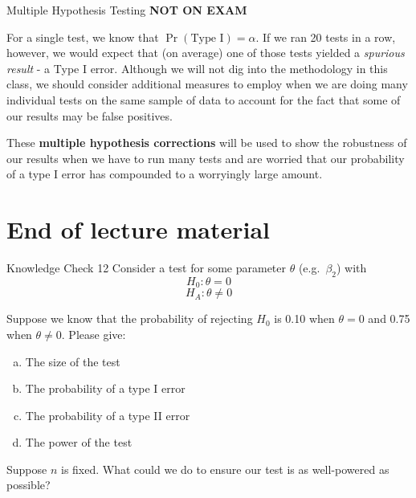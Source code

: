 \documentclass[
  ignorenonframetext,
  english,
]{beamer}
\begin{document}
\begin{frame}{Multiple Hypothesis Testing}
\protect{}\label{multiple-hypothesis-testing}
\textbf{NOT ON EXAM}

For a single test, we know that \(\Pr(\text{Type I})=\alpha\). If we ran
20 tests in a row, however, we would expect that (on average) one of
those tests yielded a \emph{spurious result} - a Type I error. Although
we will not dig into the methodology in this class, we should consider
additional measures to employ when we are doing many individual tests on
the same sample of data to account for the fact that some of our results
may be false positives.

These \textbf{multiple hypothesis corrections} will be used to show the
robustness of our results when we have to run many tests and are worried
that our probability of a type I error has compounded to a worryingly
large amount.
\end{frame}

\section{End of lecture material}\label{end-of-lecture-material}

\begin{frame}{Knowledge Check 12}
\protect{}\label{knowledge-check-12}
Consider a test for some parameter \(\theta\) (e.g.~\(\beta_2\)) with
\[H_0:\theta=0\] \[H_A:\theta\neq0\]

Suppose we know that the probability of rejecting \(H_0\) is 0.10 when
\(\theta=0\) and 0.75 when \(\theta\neq0\). Please give:

\begin{enumerate}
[a)]
\item
  The size of the test
\item
  The probability of a type I error
\item
  The probability of a type II error
\item
  The power of the test
\end{enumerate}

Suppose \(n\) is fixed. What could we do to ensure our test is as
well-powered as possible?
\end{frame}
\end{document}
